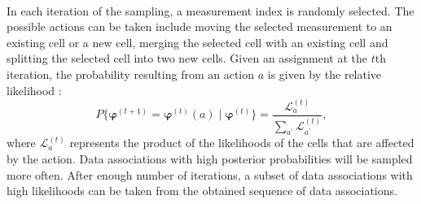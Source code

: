 ~\\
In each iteration of the sampling, a measurement index is randomly selected. The possible actions can be taken include moving the selected measurement to an existing cell or a new cell, merging the selected cell with an existing cell and splitting the selected cell into two new cells. Given an assignment at the $t$th iteration, the probability resulting from an action $a$ is given by the relative likelihood \cite{soextended}:
\begin{equation}
    P\{\boldsymbol{\varphi}^{(t+1)}=\boldsymbol{\varphi}^{(t)}(a)\mid\boldsymbol{\varphi}^{(t)}\} = \frac{\mathcal{L}^{(t)}_a}{\sum_{a^{\prime}}\mathcal{L}^{(t)}_{a^{\prime}}},
    \label{eq:sampling}
\end{equation}
where $\mathcal{L}^{(t)}_a$ represents the product of the likelihoods of the cells that are affected by the action. Data associations with high posterior probabilities will be sampled more often. After enough number of iterations, a subset of data associations with high likelihoods can be taken from the obtained sequence of data associations. 